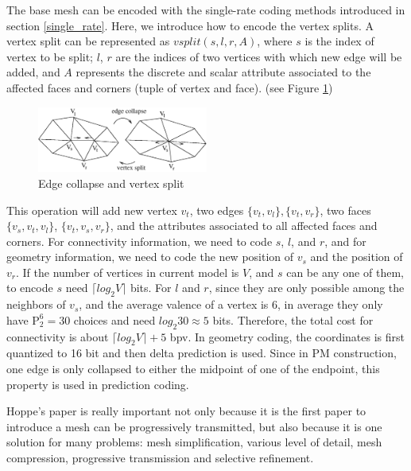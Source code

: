 \documentclass[11pt, a4paper]{report}
\begin{document}
    The base mesh can be encoded with the single-rate coding methods
    introduced in section \ref{single_rate}. Here, we introduce
    how to encode the vertex splits. A vertex split can be represented
    as $vsplit(s, l, r ,A)$, where $s$ is the index of vertex to be
    split; $l$, $r$ are the indices of two vertices with which new
    edge will be added, and $A$ represents the discrete and scalar
    attribute associated to the affected faces and corners (tuple of
    vertex and face). (see Figure \ref{split2})
\begin{figure}
\centering
\includegraphics[width=0.5\textwidth]{split2.eps}
\caption{Edge collapse and vertex split}\label{split2}
\end{figure}
    This operation will add new vertex $v_{t}$, two
    edges $\{v_{t}, v_{l}\}, \{v_{t}, v_{r}\}$, two faces $\{v_{s},
    v_{t}, v_{l}\}$, $\{v_{t}, v_{s}, v_{r}\}$, and the attributes
    associated to all affected faces and corners. For connectivity
    information, we need to code $s$, $l$, and $r$, and for geometry
    information, we need to code the new position of $v_{s}$ and the
    position of $v_{r}$. If the number of vertices in current model is
    $V$, and $s$ can be any one of them, to encode $s$ need
    ${\lceil}log_{2}V{\rceil}$ bits. For $l$ and $r$, since they are
    only possible among the neighbors of $v_{s}$, and the average
    valence of a vertex is 6, in average they only have $\mathrm{P}_{2}^{6} =
    30$ choices and need $log_{2}30 \approx 5$ bits. Therefore, the total
    cost for connectivity is about ${\lceil}log_{2}V{\rceil} + 5$ bpv.
    In geometry coding, the coordinates is first quantized to 16 bit
    and then delta prediction is used. Since in PM construction, one
    edge is only collapsed to either the midpoint of one of the
    endpoint, this property is used in prediction coding.

    Hoppe's paper \cite{hoppe96progressive} is really important
    not only because it is the first
    paper to introduce a mesh can be progressively transmitted, but
    also because it is one solution for many problems: mesh
    simplification, various level of detail, mesh compression,
    progressive transmission and selective refinement.
\end{document}
